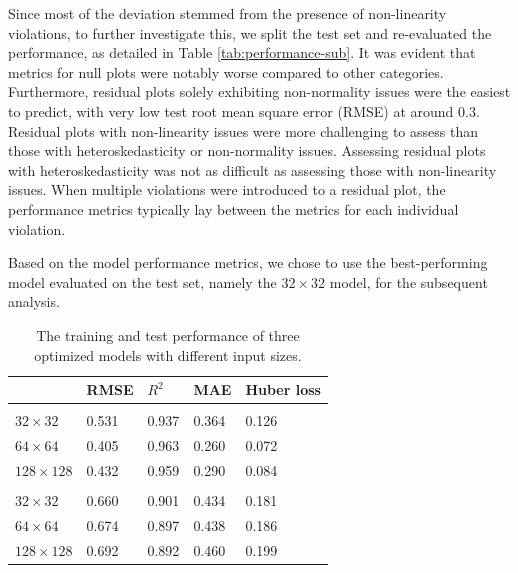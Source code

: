 \documentclass[]{interact}
\theoremstyle{plain}%
\theoremstyle{definition}
\theoremstyle{remark}
\begin{document}
Since most of the deviation stemmed from the presence of non-linearity
violations, to further investigate this, we split the test set and
re-evaluated the performance, as detailed in Table
\ref{tab:performance-sub}. It was evident that metrics for null plots
were notably worse compared to other categories. Furthermore, residual
plots solely exhibiting non-normality issues were the easiest to
predict, with very low test root mean square error (RMSE) at around
\(0.3\). Residual plots with non-linearity issues were more challenging
to assess than those with heteroskedasticity or non-normality issues.
Assessing residual plots with heteroskedasticity was not as difficult as
assessing those with non-linearity issues. When multiple violations were
introduced to a residual plot, the performance metrics typically lay
between the metrics for each individual violation.

Based on the model performance metrics, we chose to use the
best-performing model evaluated on the test set, namely the
\(32 \times 32\) model, for the subsequent analysis.

\begin{table}

\caption{\label{tab:performance}The training and test performance of three optimized models with different input sizes.}
\centering
\begin{tabular}[t]{lllll}
\toprule
 & RMSE & $R^2$ & MAE & Huber loss\\
\midrule
\addlinespace[0.3em]
\multicolumn{5}{l}{\textbf{Training set}}\\
\hspace{1em}$32 \times 32$ & 0.531 & 0.937 & 0.364 & 0.126\\
\hspace{1em}$64 \times 64$ & 0.405 & 0.963 & 0.260 & 0.072\\
\hspace{1em}$128 \times 128$ & 0.432 & 0.959 & 0.290 & 0.084\\
\addlinespace[0.3em]
\multicolumn{5}{l}{\textbf{Test set}}\\
\hspace{1em}$32 \times 32$ & 0.660 & 0.901 & 0.434 & 0.181\\
\hspace{1em}$64 \times 64$ & 0.674 & 0.897 & 0.438 & 0.186\\
\hspace{1em}$128 \times 128$ & 0.692 & 0.892 & 0.460 & 0.199\\
\bottomrule
\end{tabular}
\end{table}
\end{document}
